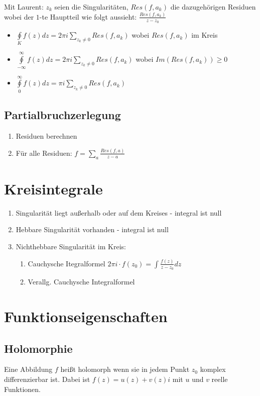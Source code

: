 \documentclass[10pt,a4paper]{article}
\begin{document}
Mit Laurent:
$z_k$ seien die Singularitäten, $Res(f, a_k)$ die dazugehörigen Residuen wobei der $1$-te Hauptteil wie folgt aussieht: $\frac{Res(f, a_k)}{z-z_0}$
\begin{itemize}
\item $\oint\limits_{K} f(z) dz = 2 \pi i \sum\limits_{z_k \neq 0} Res(f, a_k)$ wobei $Res(f, a_k)$ im Kreis
\item $\oint\limits_{-\infty}^{\infty} f(z) dz = 2 \pi i \sum\limits_{z_k \neq 0} Res(f, a_k)$ wobei $Im(Res(f, a_k)) \geq 0$
\item $\oint\limits_{0}^{\infty} f(z) dz = \pi i \sum\limits_{z_k \neq 0} Res(f, a_k)$
\end{itemize}

\subsection{Partialbruchzerlegung}
\begin{enumerate}
\item Residuen berechnen
\item Für alle Residuen: $f = \sum\limits_a \frac{Res(f, a)}{z-a}$
\end{enumerate}

\section{Kreisintegrale}
\begin{enumerate}
 \item Singularität liegt außerhalb oder auf dem Kreises - integral ist null
 \item Hebbare Singularität vorhanden - integral ist null
 \item Nichthebbare Singularität im Kreis:
 \begin{enumerate}
  \item Cauchysche Itegralformel $2 \pi i \cdot f(z_0) = \int \frac{f(z)}{z-z_0} dz$
  \item Verallg. Cauchysche Integralformel
 \end{enumerate}
\end{enumerate}

\section{Funktionseigenschaften}
\subsection{Holomorphie}
Eine Abbildung $f$ heißt holomorph wenn sie in jedem Punkt $z_0$ komplex differenzierbar ist. Dabei ist $f(z) = u(z) + v(z)i$ mit $u$ und $v$ reelle Funktionen.
\end{document}
